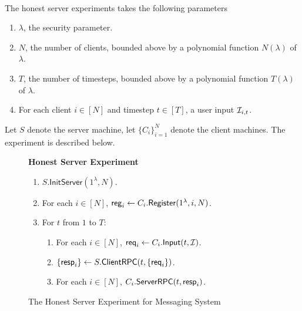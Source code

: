 \begin{definition}  \hfill\\
\label{defn:messaging-honest-server-experiment}
The honest server experiments takes the following parameters

\begin{enumerate}
    \item $\lambda$, the security parameter.
    \item $N$, the number of clients, bounded above by a polynomial function $N(\lambda)$ of $\lambda$.
    \item $T$, the number of timesteps, bounded above by a polynomial function $T(\lambda)$ of $\lambda$.
    \item For each client $i \in [N]$ and timestep $t \in [T]$, a user input $\mathcal{I}_{i, t}$.
\end{enumerate}

Let $S$ denote the server machine, let $\{C_i\}_{i = 1}^N$ denote the client machines. The experiment is described below.
\begin{figure}[ht!]
\begin{framed}
\textbf{Honest Server Experiment}
\begin{enumerate}
\item $S.\mathsf{InitServer}(1^{\lambda}, N)$. 
\item For each $i \in [N]$, $\mathsf{reg}_i \leftarrow C_i.\mathsf{Register}(1^{\lambda}, i, N)$. 
\item For $t$ from $1$ to $T$:
    \begin{enumerate}
    \item For each $i \in [N]$, $\mathsf{req}_i \leftarrow C_i.\mathsf{Input}(t, \mathcal{I})$.
    
    \item $\{\mathsf{resp}_i\} \leftarrow S.\mathsf{ClientRPC}(t, \{\mathsf{req}_i\})$.
    
    \item For each $i \in [N]$, $C_i.\mathsf{ServerRPC}(t, \mathsf{resp}_i)$.
    \end{enumerate}
\end{enumerate}
\end{framed}
\caption{The Honest Server Experiment for Messaging System}
\label{expr:messaging-honest-server}
\end{figure}

\end{definition}



